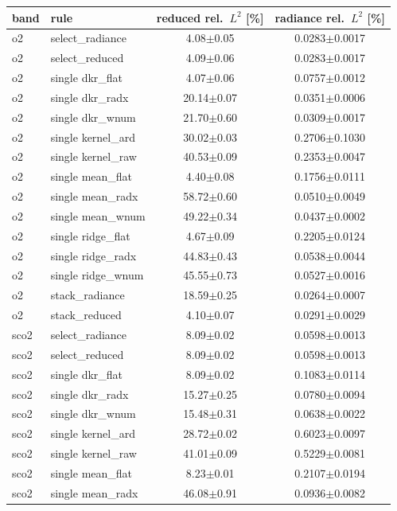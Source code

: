 \begin{tabular}{llcc}
\toprule
band & rule & reduced rel.\ $L^2$ [\%] & radiance rel.\ $L^2$ [\%] \\
\midrule
o2 & select\_radiance & 4.08$\pm$0.05 & 0.0283$\pm$0.0017 \\
o2 & select\_reduced & 4.09$\pm$0.06 & 0.0283$\pm$0.0017 \\
o2 & single dkr\_flat & 4.07$\pm$0.06 & 0.0757$\pm$0.0012 \\
o2 & single dkr\_radx & 20.14$\pm$0.07 & 0.0351$\pm$0.0006 \\
o2 & single dkr\_wnum & 21.70$\pm$0.60 & 0.0309$\pm$0.0017 \\
o2 & single kernel\_ard & 30.02$\pm$0.03 & 0.2706$\pm$0.1030 \\
o2 & single kernel\_raw & 40.53$\pm$0.09 & 0.2353$\pm$0.0047 \\
o2 & single mean\_flat & 4.40$\pm$0.08 & 0.1756$\pm$0.0111 \\
o2 & single mean\_radx & 58.72$\pm$0.60 & 0.0510$\pm$0.0049 \\
o2 & single mean\_wnum & 49.22$\pm$0.34 & 0.0437$\pm$0.0002 \\
o2 & single ridge\_flat & 4.67$\pm$0.09 & 0.2205$\pm$0.0124 \\
o2 & single ridge\_radx & 44.83$\pm$0.43 & 0.0538$\pm$0.0044 \\
o2 & single ridge\_wnum & 45.55$\pm$0.73 & 0.0527$\pm$0.0016 \\
o2 & stack\_radiance & 18.59$\pm$0.25 & 0.0264$\pm$0.0007 \\
o2 & stack\_reduced & 4.10$\pm$0.07 & 0.0291$\pm$0.0029 \\
sco2 & select\_radiance & 8.09$\pm$0.02 & 0.0598$\pm$0.0013 \\
sco2 & select\_reduced & 8.09$\pm$0.02 & 0.0598$\pm$0.0013 \\
sco2 & single dkr\_flat & 8.09$\pm$0.02 & 0.1083$\pm$0.0114 \\
sco2 & single dkr\_radx & 15.27$\pm$0.25 & 0.0780$\pm$0.0094 \\
sco2 & single dkr\_wnum & 15.48$\pm$0.31 & 0.0638$\pm$0.0022 \\
sco2 & single kernel\_ard & 28.72$\pm$0.02 & 0.6023$\pm$0.0097 \\
sco2 & single kernel\_raw & 41.01$\pm$0.09 & 0.5229$\pm$0.0081 \\
sco2 & single mean\_flat & 8.23$\pm$0.01 & 0.2107$\pm$0.0194 \\
sco2 & single mean\_radx & 46.08$\pm$0.91 & 0.0936$\pm$0.0082 \\

\end{tabular}
